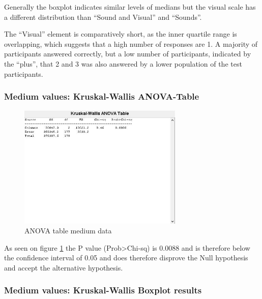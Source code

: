 Generally the boxplot indicates similar levels of medians but the visual scale has a different distribution than \enquote{Sound and Visual} and \enquote{Sounds}.

The \enquote{Visual} element is comparatively short, as the inner quartile range is overlapping, which suggests that a high number of responses are 1. 
A majority of participants answered correctly, but a low number of participants, indicated by the \enquote{plus}, that 2 and 3 was also answered by a lower population of the test participants.


\FloatBarrier
\subsubsection*{Medium values: Kruskal-Wallis ANOVA-Table} %
\label{ssub:medium_values_kruskal_wallis_anova_table}

\begin{figure}[!htbp]
    \centering
    \includegraphics[width=0.7\textwidth]{images/Evaluation5.jpg}
    \caption{ANOVA table medium data}
    \label{fig:evaluation5}
\end{figure}

As seen on figure \ref{fig:evaluation5} the P value (Prob>Chi-sq) is 0.0088 and is therefore below the confidence interval of 0.05 and does therefore disprove the Null hypothesis and accept the alternative hypothesis.


\FloatBarrier
\subsubsection*{Medium values: Kruskal-Wallis Boxplot results} %
\label{ssub:medium_values_kruskal_wallis_boxplot_results}

